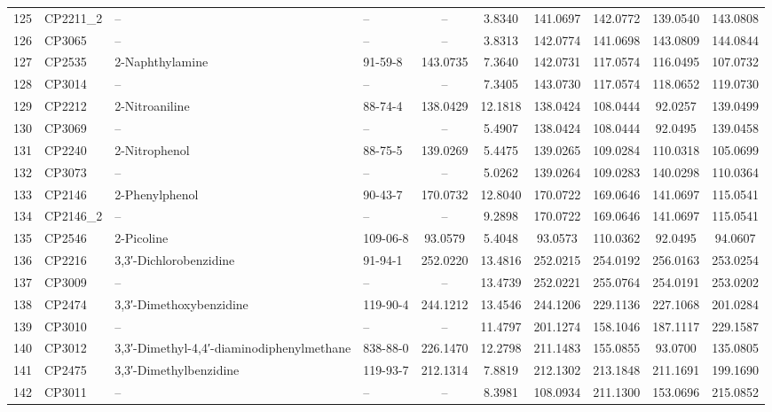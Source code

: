 \begin{longtable}{clllcccccc}
125 & CP2211\_2 & – & – & – & 3.8340 & 141.0697 & 142.0772 & 139.0540 & 143.0808 \\ 
126 & CP3065 & – & – & – & 3.8313 & 142.0774 & 141.0698 & 143.0809 & 144.0844 \\ 
127 & CP2535 & 2-Naphthylamine\smash{\textsuperscript{\textdaggerdbl}} & 91-59-8 & 143.0735 & 7.3640 & 142.0731 & 117.0574 & 116.0495 & 107.0732 \\ 
128 & CP3014 & – & – & – & 7.3405 & 143.0730 & 117.0574 & 118.0652 & 119.0730 \\ 
129 & CP2212 & 2-Nitroaniline\smash{\textsuperscript{\textdaggerdbl}} & 88-74-4 & 138.0429 & 12.1818 & 138.0424 & 108.0444 & 92.0257 & 139.0499 \\ 
130 & CP3069 & – & – & – & 5.4907 & 138.0424 & 108.0444 & 92.0495 & 139.0458 \\ 
131 & CP2240 & 2-Nitrophenol & 88-75-5 & 139.0269 & 5.4475 & 139.0265 & 109.0284 & 110.0318 & 105.0699 \\ 
132 & CP3073 & – & – & – & 5.0262 & 139.0264 & 109.0283 & 140.0298 & 110.0364 \\ 
133 & CP2146 & 2-Phenylphenol & 90-43-7 & 170.0732 & 12.8040 & 170.0722 & 169.0646 & 141.0697 & 115.0541 \\ 
134 & CP2146\_2 & – & – & – & 9.2898 & 170.0722 & 169.0646 & 141.0697 & 115.0541 \\ 
135 & CP2546 & 2-Picoline & 109-06-8 & 93.0579 & 5.4048 & 93.0573 & 110.0362 & 92.0495 & 94.0607 \\ 
136 & CP2216 & 3,3′-Dichlorobenzidine & 91-94-1 & 252.0220 & 13.4816 & 252.0215 & 254.0192 & 256.0163 & 253.0254 \\ 
137 & CP3009 & – & – & – & 13.4739 & 252.0221 & 255.0764 & 254.0191 & 253.0202 \\ 
138 & CP2474 & 3,3′-Dimethoxybenzidine & 119-90-4 & 244.1212 & 13.4546 & 244.1206 & 229.1136 & 227.1068 & 201.0284 \\ 
139 & CP3010 & – & – & – & 11.4797 & 201.1274 & 158.1046 & 187.1117 & 229.1587 \\ 
140 & CP3012 & 3,3′-Dimethyl-4,4′-diaminodiphenylmethane & 838-88-0 & 226.1470 & 12.2798 & 211.1483 & 155.0855 & 93.0700 & 135.0805 \\ 
141 & CP2475 & 3,3′-Dimethylbenzidine\smash{\textsuperscript{\textdaggerdbl}} & 119-93-7 & 212.1314 & 7.8819 & 212.1302 & 213.1848 & 211.1691 & 199.1690 \\ 
142 & CP3011 & – & – & – & 8.3981 & 108.0934 & 211.1300 & 153.0696 & 215.0852 \\ 

\end{longtable}
